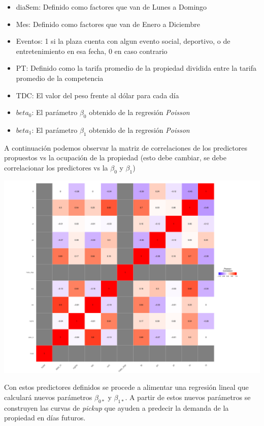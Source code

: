 \begin{itemize}
  \item diaSem: Definido como factores que van de Lunes a Domingo
  \item Mes: Definido como factores que van de Enero a Diciembre
  \item Eventos: 1 si la plaza cuenta con algun evento social, deportivo, o de entretenimiento en esa fecha, 0 en caso contrario
  \item PT: Definido como la tarifa promedio de la propiedad dividida entre la tarifa promedio de la competencia
  \item TDC: El valor del peso frente al dólar para cada día
  \item $beta_0$: El parámetro $\beta_0$ obtenido de la regresión \emph{Poisson}
  \item $beta_1$: El parámetro $\beta_1$ obtenido de la regresión \emph{Poisson}
\end{itemize}

A continuación podemos observar la matriz de correlaciones de los predictores propuestos vs la ocupación de la propiedad (esto debe cambiar, se debe correlacionar los predictores vs la $\beta_0$ y $\beta_1$)

\color{fgcolor}
\includegraphics[width=\maxwidth]{figures/Correlacion-1} 


Con estos predictores definidos se procede a alimentar una regresión lineal que calculará nuevos parámetros $\beta_{0*}$ y $\beta_{1*}$. A partir de estos nuevos parámetros se construyen las curvas de \emph{pickup} que ayuden a predecir la demanda de la propiedad en días futuros.

